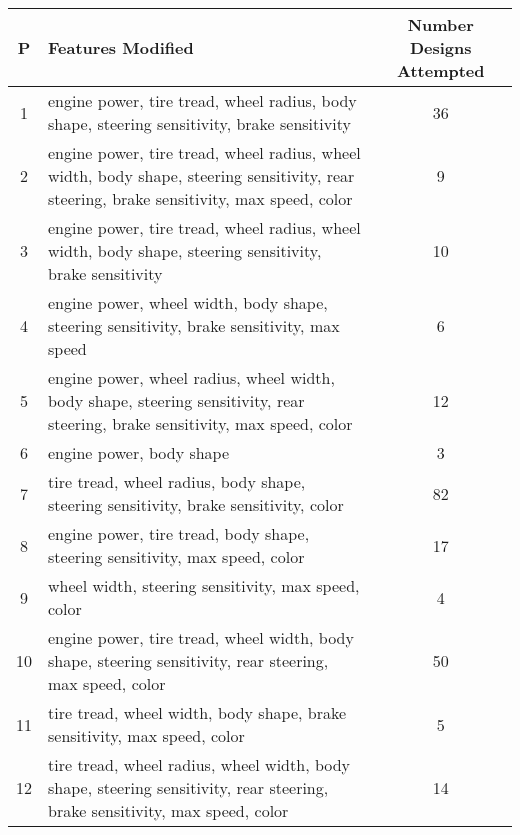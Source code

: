\begin{center}
\begin{tabular}{|c|l|c|}
\hline P & Features Modified & Number Designs Attempted\\ 
\hline
1 & engine power, tire tread, wheel radius, body shape, steering sensitivity, brake sensitivity & 36 \\ 
\hline
2 & engine power, tire tread, wheel radius, wheel width, body shape, steering sensitivity, rear steering, brake sensitivity, max speed, color & 9 \\ 
\hline
3 & engine power, tire tread, wheel radius, wheel width, body shape, steering sensitivity, brake sensitivity & 10 \\ 
\hline
4 & engine power, wheel width, body shape, steering sensitivity, brake sensitivity, max speed & 6 \\ 
\hline
5 & engine power, wheel radius, wheel width, body shape, steering sensitivity, rear steering, brake sensitivity, max speed, color & 12 \\ 
\hline
6 & engine power, body shape & 3 \\ 
\hline
7 & tire tread, wheel radius, body shape, steering sensitivity, brake sensitivity, color & 82 \\ 
\hline
8 & engine power, tire tread, body shape, steering sensitivity, max speed, color & 17 \\ 
\hline
9 & wheel width, steering sensitivity, max speed, color & 4 \\ 
\hline
10 & engine power, tire tread, wheel width, body shape, steering sensitivity, rear steering, max speed, color & 50 \\ 
\hline
11 & tire tread, wheel width, body shape, brake sensitivity, max speed, color & 5 \\ 
\hline
12 & tire tread, wheel radius, wheel width, body shape, steering sensitivity, rear steering, brake sensitivity, max speed, color & 14 \\ 
\hline
\end{tabular}
\end{center}